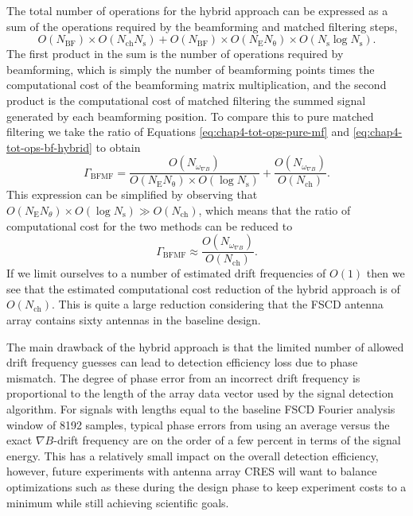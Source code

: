 The total number of operations for the hybrid approach can be expressed as a sum of the operations required by the beamforming and matched filtering steps,
\begin{equation}
    O(N_\mathrm{BF})\times O(N_\mathrm{ch}N_\mathrm{s}) + O(N_\mathrm{BF})\times O(N_\mathrm{E}N_\mathrm{\theta})\times O(N_\mathrm{s}\log{N_\mathrm{s}}).
    \label{eq:chap4-tot-ops-bf-hybrid}
\end{equation}
The first product in the sum is the number of operations required by beamforming, which is simply the number of beamforming points times the computational cost of the beamforming matrix multiplication, and the second product is the computational cost of matched filtering the summed signal generated by each beamforming position. To compare this to pure matched filtering we take the ratio of Equations \ref{eq:chap4-tot-ops-pure-mf} and \ref{eq:chap4-tot-ops-bf-hybrid} to obtain 
\begin{equation}
    \Gamma_\mathrm{BFMF}=\frac{O(N_{\omega_{\nabla B}})}{O(N_\mathrm{E}N_\mathrm{\theta})\times O(\log{N_\mathrm{s}})} + \frac{O(N_{\omega_{\nabla B}})}{O(N_\mathrm{ch})}.
\end{equation}
This expression can be simplified by observing that $O(N_\mathrm{E}N_\theta)\times O(\log{N_\mathrm{s}})\gg O(N_\mathrm{ch})$, which means that the ratio of computational cost for the two methods can be reduced to
\begin{equation}
    \Gamma_\mathrm{BFMF}\approx \frac{O(N_{\omega_{\nabla B}})}{O(N_\mathrm{ch})}.
\end{equation} 
If we limit ourselves to a number of estimated drift frequencies of $O(1)$ then we see that the estimated computational cost reduction of the hybrid approach is of $O(N_\mathrm{ch})$. This is quite a large reduction considering that the FSCD antenna array contains sixty antennas in the baseline design. 

The main drawback of the hybrid approach is that the limited number of allowed drift frequency guesses can lead to detection efficiency loss due to phase mismatch. The degree of phase error from an incorrect drift frequency is proportional to the length of the array data vector used by the signal detection algorithm. For signals with lengths equal to the baseline FSCD Fourier analysis window of 8192 samples, typical phase errors from using an average versus the exact $\nabla B$-drift frequency are on the order of a few percent in terms of the signal energy. This has a relatively small impact on the overall detection efficiency, however, future experiments with antenna array CRES will want to balance optimizations such as these during the design phase to keep experiment costs to a minimum while still achieving scientific goals.


